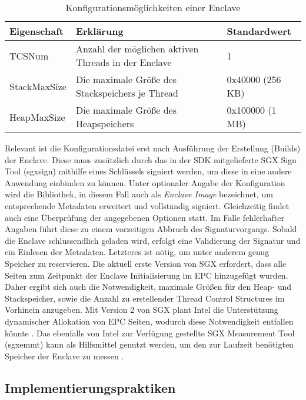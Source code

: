 \begin{table}[h]
	\centering
	\caption{Konfigurationsmöglichkeiten einer Enclave}
	\begin{tabular}{|l|l|l|}
		\hline
		\textbf{Eigenschaft} & \textbf{Erklärung} & \textbf{Standardwert} \\
		\hline
		TCSNum & Anzahl der möglichen aktiven Threads in der Enclave & 1 \\
		\hline
		StackMaxSize & Die maximale Größe des Stackspeichers je Thread & 0x40000 (256 KB) \\
		\hline
		HeapMaxSize & Die maximale Größe des Heapspeichers & 0x100000 (1 MB) \\
		\hline
	\end{tabular}
	\label{tab:sgxconfig}
\end{table}

Relevant ist die Konfigurationsdatei erst nach Ausführung der Erstellung (Builds) der Enclave. Diese muss zusätzlich durch das in der \ac{SDK} mitgelieferte \ac{SGX} Sign Tool (sgx\textunderscore sign) mithilfe eines Schlüssels signiert werden, um diese in eine andere Anwendung einbinden zu können. Unter optionaler Angabe der Konfiguration wird die Bibliothek, in diesem Fall auch als \textit{Enclave Image} bezeichnet, um entsprechende Metadaten erweitert und vollständig signiert. Gleichzeitig findet auch eine Überprüfung der angegebenen Optionen statt. Im Falle fehlerhafter Angaben führt diese zu einem vorzeitigen Abbruch des Signaturvorgangs. Sobald die Enclave schlussendlich geladen wird, erfolgt eine Validierung der Signatur und ein Einlesen der Metadaten. Letzteres ist nötig, um unter anderem genug Speicher zu reservieren. Die aktuell erste Version von \ac{SGX} erfordert, dass alle Seiten zum Zeitpunkt der Enclave Initialisierung im \ac{EPC} hinzugefügt wurden. Daher ergibt sich auch die Notwendigkeit, maximale Größen für den Heap- und Stackspeicher, sowie die Anzahl zu erstellender Thread Control Structures im Vorhinein anzugeben. Mit Version 2 von \ac{SGX} plant Intel die Unterstützung dynamischer Allokation von EPC Seiten, wodurch diese Notwendigkeit entfallen könnte \cite{McKeen2016}. Das ebenfalls von Intel zur Verfügung gestellte \ac{SGX} Measurement Tool (sgx\textunderscore emmt) kann als Hilfsmittel genutzt werden, um den zur Laufzeit benötigten Speicher der Enclave zu messen \cite{WinDev}.

\subsection{Implementierungspraktiken}

